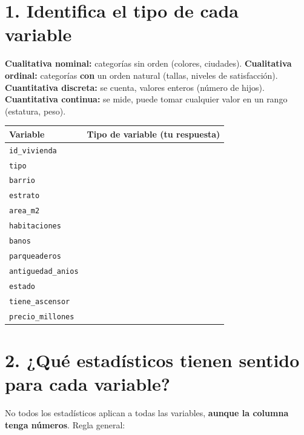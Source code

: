 \documentclass[11pt]{article}
\begin{document}
\section*{1. Identifica el tipo de cada variable}

\begin{recuerda}
\small
\textbf{Cualitativa nominal:} categorías sin orden (colores, ciudades).
\textbf{Cualitativa ordinal:} categorías \textbf{con} un orden natural
(tallas, niveles de satisfacción).
\textbf{Cuantitativa discreta:} se cuenta, valores enteros (número de
hijos).
\textbf{Cuantitativa continua:} se mide, puede tomar cualquier valor en
un rango (estatura, peso).
\end{recuerda}

\vspace{4pt}
\small
\renewcommand{\arraystretch}{1.6}
\begin{center}
\begin{tabular}{@{}p{4cm}p{9.5cm}@{}}
\toprule
\textbf{Variable} & \textbf{Tipo de variable (tu respuesta)} \\
\midrule
\texttt{id\_vivienda} & \hrulefill \\
\texttt{tipo} & \hrulefill \\
\texttt{barrio} & \hrulefill \\
\texttt{estrato} & \hrulefill \\
\texttt{area\_m2} & \hrulefill \\
\texttt{habitaciones} & \hrulefill \\
\texttt{banos} & \hrulefill \\
\texttt{parqueaderos} & \hrulefill \\
\texttt{antiguedad\_anios} & \hrulefill \\
\texttt{estado} & \hrulefill \\
\texttt{tiene\_ascensor} & \hrulefill \\
\texttt{precio\_millones} & \hrulefill \\
\bottomrule
\end{tabular}
\end{center}

\newpage
\section*{2. ¿Qué estadísticos tienen sentido para cada variable?}

No todos los estadísticos aplican a todas las variables, \textbf{aunque
la columna tenga números}. Regla general:
\end{document}
